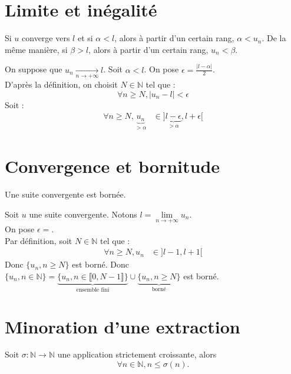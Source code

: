 \documentclass[../main.tex]{subfiles}
\begin{document}
\section{Limite et inégalité}
\begin{tcolorbox}[title=Propostion 14.23, title filled=false, colframe=lightblue, colback=lightblue!10!white]
    Si $u$ converge vers $l$ et si $\alpha < l$, alors à partir d'un certain rang, $\alpha < u_n$. De la même manière, si $\beta > l$, alors à partir d'un certain rang, $u_n < \beta$. 
\end{tcolorbox}

On suppose que $u_n \underset{n \to +\infty}{\longrightarrow} l$. Soit $\alpha < l$. On pose $\epsilon = \frac{|l-\alpha|}{2}$. \\
D'après la définition, on choisit $N \in \mathbb{N}$ tel que : 
$$\forall n \geq N, |u_n - l| < \epsilon$$
Soit : 
\begin{align*}
    \forall n \geq N, \underbrace{u_n}_{> \alpha} &\in ]\underbrace{l-\epsilon}_{> \alpha}, l+\epsilon[
\end{align*}

\section{Convergence et bornitude}
\begin{tcolorbox}[title=Propostion 14.24, title filled=false, colframe=lightblue, colback=lightblue!10!white]
    Une suite convergente est bornée. 
\end{tcolorbox}

Soit $u$ une suite convergente. Notons $l = \lim\limits_{n \to +\infty} u_n$. \\
On pose $\epsilon = $. \\
Par définition, soit $N \in \mathbb{N}$ tel que : 
\begin{align*}
    \forall n \geq N, u_n &\in ]l-1, l+1[
\end{align*}
Donc $\{ u_n, n \geq N \}$ est borné. 
Donc $\{ u_n, n \in \mathbb{N} \} = \underbrace{\{ u_n, n \in \llbracket 0, N-1 \rrbracket \}}_{\text{ensemble fini}} \cup \underbrace{\{ u_n, n \geq N \}}_{\text{borné}}$ est borné. 

\setcounter{section}{28}
\section{Minoration d'une extraction}
\begin{tcolorbox}[title=Lemme 14.29, title filled=false, colframe=orange, colback=orange!10!white]
    Soit $\sigma : \mathbb{N} \to \mathbb{N}$ une application strictement croissante, alors
    $$\forall n \in \mathbb{N}, n \leq \sigma(n). $$
\end{tcolorbox}
\end{document}

